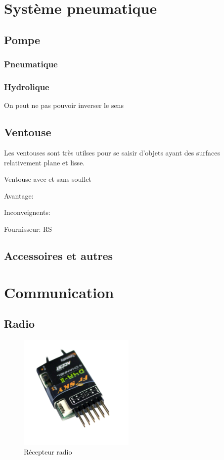 \documentclass[a4paper, 11pt]{report}
\begin{document}
\chapter{Système pneumatique}

\section{Pompe}

\subsection{Pneumatique}

\subsection{Hydrolique}

On peut ne pas pouvoir inverser le sens

\section{Ventouse}
Les ventouses sont très utilses pour se saisir d'objets ayant des surfaces relativement plane et lisse.

Ventouse avec et sans souflet

Avantage:

Inconveignents:

Fournisseur: RS

\section{Accessoires et autres}

\chapter{Communication}

\section{Radio}

\begin{figure}[h]
\begin{centering}
\includegraphics[width=0.5\textwidth]{images/recepteurRadio.jpg}
\caption{Récepteur radio}
\par\end{centering}
\end{figure}
\end{document}
